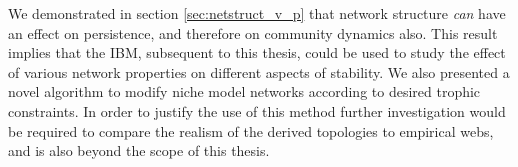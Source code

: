 We demonstrated in section \ref{sec:netstruct_v_p} that network structure \emph{can} have an effect on persistence, and therefore on community dynamics also. This result implies that the IBM, subsequent to this thesis, could be used to study the effect of various network properties on different aspects of stability. We also presented a novel algorithm to modify niche model networks according to desired trophic constraints. In order to justify the use of this method further investigation would be required to compare the realism of the derived topologies to empirical webs, and is also beyond the scope of this thesis.

%

